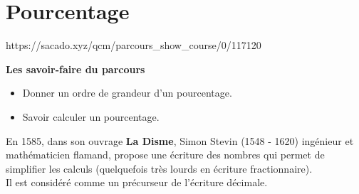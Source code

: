 \chapter{Pourcentage}
{https://sacado.xyz/qcm/parcours_show_course/0/117120}
{ 

 \begin{CpsCol}
 \textbf{Les savoir-faire du parcours} 
 \begin{itemize}
 \item Donner un ordre de grandeur d'un pourcentage.
 \item Savoir calculer un pourcentage.
 \end{itemize}
 \end{CpsCol}
}


\begin{His} 
 
En 1585, dans son ouvrage \textbf{La Disme}, Simon Stevin (1548 - 1620) ingénieur et mathématicien flamand, propose une écriture des nombres qui permet de simplifier les calculs (quelquefois très lourds en écriture fractionnaire).\\

Il est considéré comme un précurseur de l'écriture décimale.
 

\end{His} 

